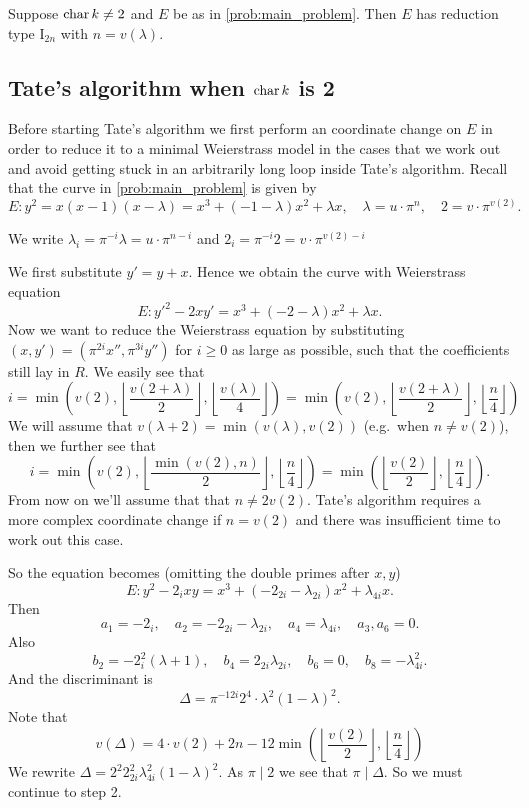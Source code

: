 \begin{proposition}\label{prop:conclusion_tate_tame}
	Suppose $\operatorname{char} k \ne 2$ and $E$ be as in \cref{prob:main_problem}. 
	Then $E$ has reduction type $\mathrm I_{2n}$ with $n = v(\lambda)$. 
\end{proposition}

\subsection{Tate's algorithm when $\operatorname{char} k$ is 2}  \label{sec:char_k_is_2}

Before starting Tate's algorithm we first perform an coordinate change on $E$ in order to reduce it to a minimal Weierstrass model in the cases that we work out and avoid getting stuck in an arbitrarily long loop inside Tate's algorithm. 
Recall that the curve in \cref{prob:main_problem} is given by \[
	E: y^2 = x(x-1)(x-\lambda) = x^3 + (-1 -\lambda) x^2 + \lambda x, \quad \lambda = u \cdot \pi^{n}, \quad 2 = v\cdot \pi^{v(2)}
.\] 
\begin{notation}
	We write $\lambda_i = \pi^{-i} \lambda = u\cdot \pi ^{n -i}$ and $2_i = \pi^{-i}2 = v \cdot \pi^{v(2) - i}$
\end{notation}
We first substitute $y' = y + x$. 
Hence we obtain the curve with Weierstrass equation \[
	E: y'^2 - 2xy' = x^3 + (-2-\lambda) x^2 + \lambda x
.\] 
Now we want to reduce the Weierstrass equation by substituting $(x, y') = (\pi^{2i} x'', \pi^{3i}y'')$ for $i \ge 0$ as large as possible, such that the coefficients still lay in $R$. 
We easily see that \[
	i =  \min\left(v(2), \left\lfloor \frac{v(2 + \lambda)}{2} \right\rfloor,  \left\lfloor \frac{v(\lambda)}{4} \right\rfloor\right) = \min\left(v(2), \left\lfloor \frac{v(2 + \lambda)}{2} \right\rfloor,  \left\lfloor \frac{n}{4} \right\rfloor\right) 
\]
We will assume that $v(\lambda + 2) = \min(v(\lambda), v(2))$ (e.g.\ when $n \ne v(2)$), then we further see that \[
	i = \min\left(v(2), \left\lfloor \frac{\min (v(2), n)}{2} \right\rfloor,  \left\lfloor \frac{n}{4} \right\rfloor\right)  = \min\left(\left\lfloor \frac{v(2)}{2}\right\rfloor, \left\lfloor \frac{n}{4} \right\rfloor \right)
.\] 
From now on we'll assume that that $n \ne 2v(2)$. 
Tate's algorithm requires a more complex coordinate change if $n = v(2)$ and there was insufficient time to work out this case. 

So the equation becomes (omitting the double primes after $x, y$) \[
	E: y^2 - 2_i xy = x^3 + (-2_{2i} - \lambda_{2i})x^2 + \lambda_{4i}x
.\] 
Then \[
a_1 = -2_i, \quad a_2 = -2_{2i} - \lambda_{2i}, \quad a_4 =  \lambda_{4i}, \quad a_3, a_6 = 0 
.\] 
Also 
\[
	b_2 = -2_{i}^2 (\lambda + 1), \quad b_4 = 2_{2i}\lambda_{2i}, \quad b_6 = 0,\quad  b_8 = -\lambda_{4i}^2
.\] 
And the discriminant is \[
	\Delta = \pi^{-12i} 2^{4}\cdot \lambda^2(1 - \lambda)^2
.\] 
Note that \[
	v(\Delta) = 4\cdot v(2)+ 2n - 12 \min\left(\left\lfloor \frac{v(2)}{2}\right\rfloor, \left\lfloor \frac{n}{4} \right\rfloor \right)
\]
We rewrite $\Delta = 2^{2} 2_{2i}^2 \lambda_{4i}^2 (1- \lambda)^2$. 
As $\pi\mid 2$ we see that $\pi \mid \Delta$. 
So we must continue to step 2.

